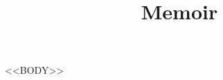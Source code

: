 \documentclass[12pt,oneside]{memoir}
\title{Memoir}
\author{}
\date{}
\begin{document}
\maketitle

\clearpage

<<BODY>>
\end{document}
